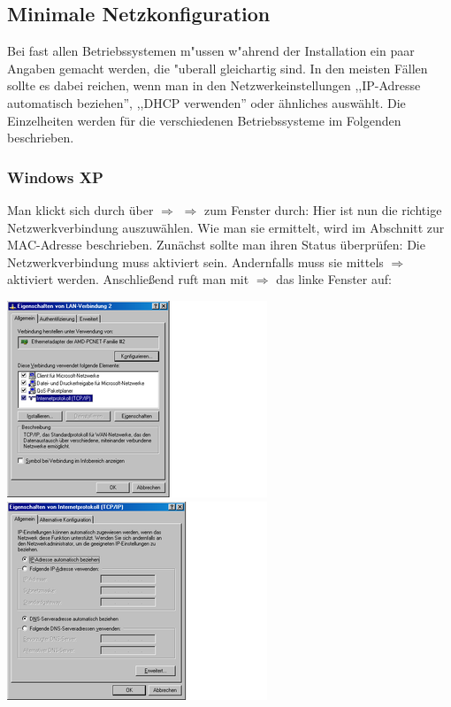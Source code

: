 
\subsection{Minimale Netzkonfiguration}
Bei fast allen Betriebssystemen m"ussen w"ahrend der Installation ein paar
Angaben gemacht werden, die "uberall gleichartig sind. In den meisten
Fällen sollte es dabei reichen, wenn man in den Netzwerkeinstellungen
,,IP-Adresse automatisch beziehen'', ,,DHCP verwenden'' oder ähnliches
auswählt. Die Einzelheiten werden für die verschiedenen
Betriebssysteme im Folgenden beschrieben.
\subsubsection{Windows XP}
Man klickt sich durch  über  $\Rightarrow$
 $\Rightarrow$  zum Fenster
 durch:
Hier ist nun die richtige Netzwerkverbindung auszuwählen. Wie man sie
ermittelt, wird im Abschnitt zur MAC-Adresse beschrieben. Zunächst
sollte man ihren Status überprüfen:  Die Netzwerkverbindung muss
aktiviert sein. Andernfalls muss sie mittels
$\Rightarrow$ aktiviert
werden.  Anschließend ruft man mit
$\Rightarrow$ das linke Fenster auf:  
\begin{center}
\includegraphics{bilder/eigenschaften_xp}
\includegraphics{bilder/dhcp_xp}    
\end{center}
 

